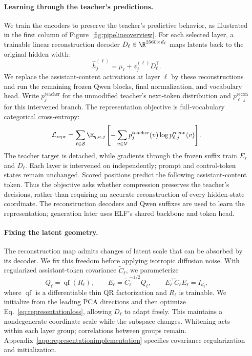 \paragraph{Learning through the teacher's predictions.}
We train the encoders to preserve the teacher's predictive behavior, as illustrated in the first column of Figure~\ref{fig:pipelineoverview}. For each selected layer, a trainable linear reconstruction decoder $D_\ell\in\R^{2560\times d_\ell}$ maps latents back to the original hidden width:
\begin{equation}
 \widehat h_j^{(\ell)}=\mu_\ell+z_j^{(\ell)}D_\ell^\top.
 \label{eq:representationreconstruction}
\end{equation}
We replace the assistant-content activations at layer $\ell$ by these reconstructions and run the remaining frozen Qwen blocks, final normalization, and vocabulary head. Write $p_j^{\mathrm{teacher}}$ for the unmodified teacher's next-token distribution and $p_{\ell,j}^{\mathrm{recon}}$ for this intervened branch. The representation objective is full-vocabulary categorical cross-entropy:
\begin{equation}
 \mathcal L_{\mathrm{repr}}
 =\sum_{\ell\in\mathcal S}\E_{q,a,j}
 \left[-\sum_{v\in\mathcal V}p_j^{\mathrm{teacher}}(v)
 \log p_{\ell,j}^{\mathrm{recon}}(v)\right].
 \label{eq:representationloss}
\end{equation}
The teacher target is detached, while gradients through the frozen suffix train $E_\ell$ and $D_\ell$. Each layer is intervened on independently; prompt and control-token states remain unchanged. Scored positions predict the following assistant-content token. Thus the objective asks whether compression preserves the teacher's decisions, rather than requiring an accurate reconstruction of every hidden-state coordinate. The reconstruction decoders and Qwen suffixes are used to learn the representation; generation later uses ELF's shared backbone and token head.

\paragraph{Fixing the latent geometry.}
The reconstruction map admits changes of latent scale that can be absorbed by its decoder. We fix this freedom before applying isotropic diffusion noise. With regularized assistant-token covariance $\widetilde C_\ell$, we parameterize
\begin{equation}
 Q_\ell=\operatorname{qf}(R_\ell),\qquad
 E_\ell=\widetilde C_\ell^{-1/2}Q_\ell,\qquad
 E_\ell^\top\widetilde C_\ell E_\ell=I_{d_\ell},
 \label{eq:representationwhitening}
\end{equation}
where $\operatorname{qf}$ is a differentiable thin QR factorization and $R_\ell$ is trainable. We initialize from the leading PCA directions and then optimize Eq.~\eqref{eq:representationloss}, allowing $D_\ell$ to adapt freely. This maintains a nondegenerate coordinate scale while the subspace changes. Whitening acts within each layer group; correlations between groups remain. Appendix~\ref{app:representationimplementation} specifies covariance regularization and initialization.

